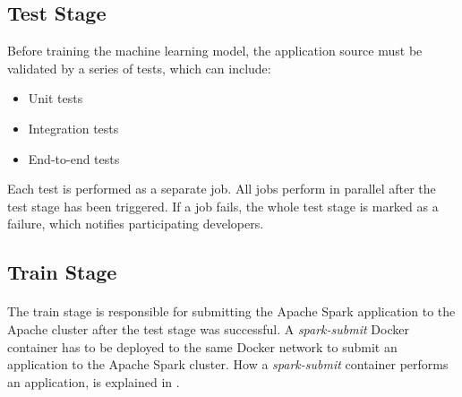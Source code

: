 \subsection{Test Stage}
Before training the machine learning model, the application source must be validated by a series of tests, which can include:
\begin{itemize}
\item Unit tests
\item Integration tests
\item End-to-end tests
\end{itemize}
Each test is performed as a separate job. All jobs perform in parallel after the test stage has been triggered.
If a job fails, the whole test stage is marked as a failure, which notifies participating developers.


\subsection{Train Stage}
\paragraph{}
The train stage is responsible for submitting the Apache Spark application to the Apache cluster after the test stage was successful.
A \textit{spark-submit} Docker container has to be deployed to the same Docker network to submit an application to the Apache Spark cluster. How a \textit{spark-submit} container performs an application, is explained in .

